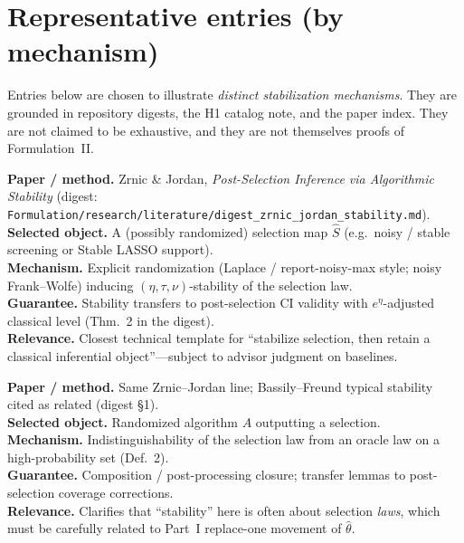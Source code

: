 \documentclass[11pt]{article}
\begin{document}
\section{Representative entries (by mechanism)}

Entries below are chosen to illustrate \emph{distinct stabilization mechanisms}.
They are grounded in repository digests, the H1 catalog note, and the paper index.
They are not claimed to be exhaustive, and they are not themselves proofs of
Formulation~II.

\begin{tcolorbox}[entrybox, title=Randomized selection / noisy max]
\textbf{Paper / method.} Zrnic \& Jordan, \emph{Post-Selection Inference via Algorithmic Stability}
(digest: \texttt{Formulation/research/literature/digest\_zrnic\_jordan\_stability.md}).\\
\textbf{Selected object.} A (possibly randomized) selection map $\hat S$ (e.g.\ noisy /
stable screening or Stable LASSO support).\\
\textbf{Mechanism.} Explicit randomization (Laplace / report-noisy-max style; noisy
Frank--Wolfe) inducing $(\eta,\tau,\nu)$-stability of the selection law.\\
\textbf{Guarantee.} Stability transfers to post-selection CI validity with
$e^\eta$-adjusted classical level (Thm.~2 in the digest).\\
\textbf{Relevance.} Closest technical template for ``stabilize selection, then retain a
classical inferential object''---subject to advisor judgment on baselines.
\end{tcolorbox}

\begin{tcolorbox}[entrybox, title=Algorithmic stability (distributional)]
\textbf{Paper / method.} Same Zrnic--Jordan line; Bassily--Freund typical stability cited
as related (digest §1).\\
\textbf{Selected object.} Randomized algorithm $A$ outputting a selection.\\
\textbf{Mechanism.} Indistinguishability of the selection law from an oracle law on a
high-probability set (Def.~2).\\
\textbf{Guarantee.} Composition / post-processing closure; transfer lemmas to
post-selection coverage corrections.\\
\textbf{Relevance.} Clarifies that ``stability'' here is often about selection
\emph{laws}, which must be carefully related to Part~I replace-one movement of
$\hat\theta$.
\end{tcolorbox}
\end{document}
